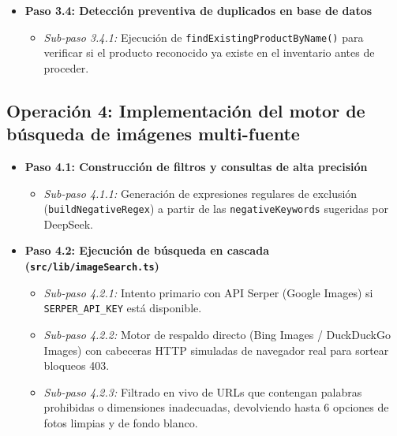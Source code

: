 \documentclass[11pt,a4paper]{article}
\begin{document}
\begin{itemize}
\begin{itemize}
\begin{itemize}
            \item \texttt{description}: Descripción técnica minuciosa de 1 a 3 frases.
            \item \texttt{category}: Categoría estandarizada en español obligatoria.
            \item \texttt{searchQueries}: 2 a 3 consultas en inglés/términos de catálogo internacional para búsqueda de fotos idénticas.
            \item \texttt{negativeKeywords}: Lista de términos no deseados (ej: \texttt{["hub", "dock", "cable 2m"]}) para evitar falsas coincidencias.
        \end{itemize}
        \item \textit{Sub-paso 3.3.4:} Envío del prompt de contexto con cero margen de error y el bloque de archivo binario (\texttt{type: "file", data: base64, mediaType: mimeType}).
    \end{itemize}
    \item \textbf{Paso 3.4: Detección preventiva de duplicados en base de datos}
    \begin{itemize}
        \item \textit{Sub-paso 3.4.1:} Ejecución de \texttt{findExistingProductByName()} para verificar si el producto reconocido ya existe en el inventario antes de proceder.
    \end{itemize}
\end{itemize}

\subsection{Operación 4: Implementación del motor de búsqueda de imágenes multi-fuente}
\begin{itemize}
    \item \textbf{Paso 4.1: Construcción de filtros y consultas de alta precisión}
    \begin{itemize}
        \item \textit{Sub-paso 4.1.1:} Generación de expresiones regulares de exclusión (\texttt{buildNegativeRegex}) a partir de las \texttt{negativeKeywords} sugeridas por DeepSeek.
    \end{itemize}
    \item \textbf{Paso 4.2: Ejecución de búsqueda en cascada (\texttt{src/lib/imageSearch.ts})}
    \begin{itemize}
        \item \textit{Sub-paso 4.2.1:} Intento primario con API Serper (Google Images) si \texttt{SERPER\_API\_KEY} está disponible.
        \item \textit{Sub-paso 4.2.2:} Motor de respaldo directo (Bing Images / DuckDuckGo Images) con cabeceras HTTP simuladas de navegador real para sortear bloqueos 403.
        \item \textit{Sub-paso 4.2.3:} Filtrado en vivo de URLs que contengan palabras prohibidas o dimensiones inadecuadas, devolviendo hasta 6 opciones de fotos limpias y de fondo blanco.
    \end{itemize}
\end{itemize}
\end{document}
